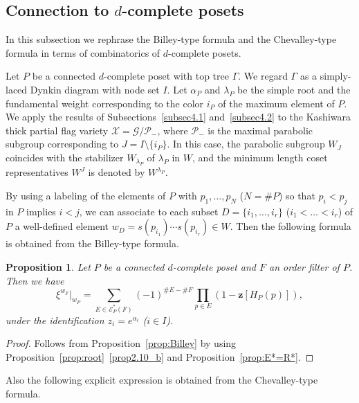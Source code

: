 \documentclass[10pt]{amsart}
\newtheorem{prop}[theo]{Proposition}
\theoremstyle{definition}
\theoremstyle{remark}
\newcommand\vectz{\boldsymbol{z}}
\newcommand\EE{\mathcal{E}}
\newcommand\GG{\mathcal{G}}
\newcommand\PP{\mathcal{P}}
\newcommand\XX{\mathcal{X}}
\begin{document}
\subsection{%
Connection to \texorpdfstring{$d$}{d}-complete posets
}\label{subsec4.3}

In this subsection we rephrase the Billey-type formula and the Chevalley-type formula 
in terms of combinatorics of $d$-complete posets.

Let $P$ be a connected $d$-complete poset with top tree $\Gamma$.
We regard $\Gamma$ as a simply-laced Dynkin diagram with node set $I$.
Let $\alpha_P$ and $\lambda_P$ be the simple root and the fundamental weight 
corresponding to the color $i_P$ of the maximum element of $P$.
We apply the results of Subsections~\ref{subsec4.1} and~\ref{subsec4.2} 
to the Kashiwara thick partial flag variety 
$\XX = \GG/\PP_-$, where $\PP_-$ is the maximal parabolic subgroup corresponding 
to $J = I \setminus \{ i_P \}$.
In this case, the parabolic subgroup $W_J$ coincides with the stabilizer $W_{\lambda_P}$ of $\lambda_P$ in $W$, 
and the minimum length coset representatives $W^J$ is denoted by $W^{\lambda_P}$.

By using a labeling of the elements of $P$ with $p_1, \ldots, p_N$ ($N= \# P$) 
so that $p_i < p_j$ in $P$ implies $i<j$, 
we can associate to each subset $D = \{ i_1, \dots, i_r \}$ ($i_1 < \dots < i_r$) of $P$ 
a well-defined element $w_D = s(p_{i_1}) \cdots s(p_{i_r}) \in W$.
Then the following formula is obtained from the Billey-type formula.

\begin{prop}
\label{prop:Billey_P}
Let $P$ be a connected $d$-complete poset and $F$ an order filter of $P$.
Then we have
\begin{equation}
\label{eq:Billey_P}
\xi^{w_F}|_{w_P}
 =
\sum_{E \in \EE^*_P(F)}
 (-1)^{\# E - \# F}
 \prod_{p \in E} \left( 1 - \vectz[H_P(p)] \right),
\end{equation}
under the identification $z_i = e^{\alpha_i}$ \textup{(}$i \in I$\textup{)}.
\end{prop}

\begin{proof}
Follows from Proposition~\ref{prop:Billey} 
by using Proposition~\ref{prop:root}~\ref{prop2.10_b} and Proposition~\ref{prop:E*=R*}.
\end{proof}

Also the following explicit expression is obtained from the Chevalley-type formula.
\end{document}
